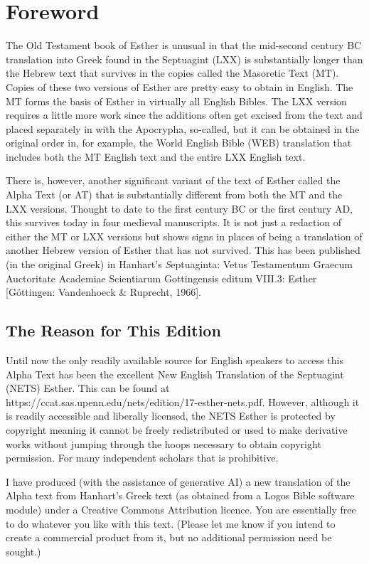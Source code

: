 \clearpage
{
  \fontsize{11}{13.5}\selectfont
  \setlength{\parindent}{1.5em}
\section*{Foreword}

The Old Testament book of Esther is unusual in that the mid-second century BC translation into Greek found in the Septuagint (LXX) is substantially longer than the Hebrew text that survives in the copies called the Masoretic Text (MT). Copies of these two versions of Esther are pretty easy to obtain in English. The MT forms the basis of Esther in virtually all English Bibles. The LXX version requires a little more work since the additions often get excised from the text and placed separately in with the Apocrypha, so-called, but it can be obtained in the original order in, for example, the World English Bible (WEB) translation that includes both the MT English text and the entire LXX English text.

There is, however, another significant variant of the text of Esther called the Alpha Text (or AT) that is substantially different from both the MT and the LXX versions. Thought to date to the first century BC or the first century AD, this survives today in four medieval manuscripts. It is not just a redaction of either the MT or LXX versions but shows signs in places of being a translation of another Hebrew version of Esther that has not survived. This has been published (in the original Greek) in Hanhart's {\textit Septuaginta:
Vetus Testamentum Graecum Auctoritate Academiae Scientiarum Gottingensis editum VIII.3: Esther} [Göttingen:
Vandenhoeck \& Ruprecht, 1966].

\subsection*{The Reason for This Edition}
Until now the only readily available source for English speakers to access this Alpha Text has been the excellent New English Translation of the Septuagint (NETS) Esther. This can be found at https://ccat.sas.upenn.edu/nets/edition/17-esther-nets.pdf. However, although it is readily accessible and liberally licensed, the NETS Esther is protected by copyright meaning it cannot be freely redistributed or used to make derivative works without jumping through the hoops necessary to obtain copyright permission. For many independent scholars that is prohibitive.

I have produced (with the assistance of generative AI) a new translation of the Alpha text from Hanhart's Greek text (as obtained from a Logos Bible software module) under a Creative Commons Attribution licence. You are essentially free to do whatever you like with this text. (Please let me know if you intend to create a commercial product from it, but no additional permission need be sought.)

}
